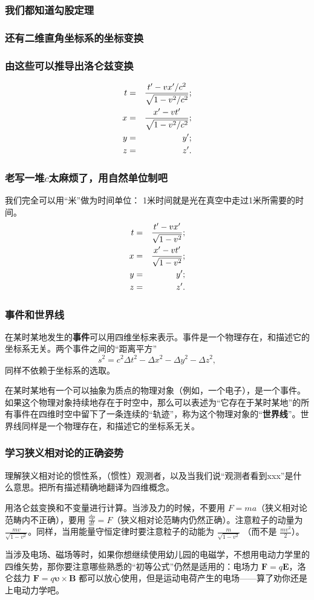 \documentclass[CJK,13pt]{beamer}
\date{}
\begin{document}
  \bch
{}


\begin{frame}
  \frametitle{我们都知道勾股定理}
\end{frame}


\begin{frame}
  \frametitle{还有二维直角坐标系的坐标变换}
\end{frame}


\begin{frame}
  \frametitle{由这些可以推导出洛仑兹变换}
  \begin{eqnarray}
  t&=&\frac{t'-vx'/c^2}{\sqrt{1-v^2/c^2}}; \nonumber \\
  x&=&\frac{x'-vt'}{\sqrt{1-v^2/c^2}}; \nonumber \\
  y&=&y'; \nonumber \\
  z&=&z'. \nonumber
  \end{eqnarray}
\end{frame}


\begin{frame}
  \frametitle{老写一堆$c$太麻烦了，用自然单位制吧}
  我们完全可以用``米''做为时间单位： 1米时间就是光在真空中走过1米所需要的时间。
  \begin{eqnarray}
  t&=&\frac{t'-vx'}{\sqrt{1-v^2}}; \nonumber \\
  x&=&\frac{x'-vt'}{\sqrt{1-v^2}}; \nonumber \\
  y&=&y'; \nonumber \\
  z&=&z'. \nonumber
  \end{eqnarray}
\end{frame}

\begin{frame}
  \frametitle{事件和世界线}
  \bitem
  \item{在某时某地发生的{\bf 事件}可以用四维坐标来表示。事件是一个物理存在，和描述它的坐标系无关。两个事件之间的``距离平方'' $$s^2= c^2\Delta t^2 - \Delta x^2 -\Delta y^2-\Delta z^2,$$同样不依赖于坐标系的选取。}
  \item{在某时某地有一个可以抽象为质点的物理对象（例如，一个电子），是一个事件。如果这个物理对象持续地存在于时空中，那么可以表述为``它存在于某时某地''的所有事件在四维时空中留下了一条连续的“轨迹”，称为这个物理对象的“{\bf 世界线}”。世界线同样是一个物理存在，和描述它的坐标系无关。}
    \eitem
\end{frame}




\begin{frame}
  \frametitle{学习狭义相对论的正确姿势}
  \bitem
\item{理解狭义相对论的惯性系，（惯性）观测者，以及当我们说“观测者看到xxx”是什么意思。把所有描述精确地翻译为四维概念。}
\item{用洛仑兹变换和不变量进行计算。当涉及力的时候，不要用  $F=ma$（狭义相对论范畴内不正确），要用 $\frac{dp}{dt} = F$（狭义相对论范畴内仍然正确）。注意粒子的动量为
  $\frac{mv}{\sqrt{1-v^2}}$。同样，当用能量守恒定律时要注意粒子的动能为 $\frac{m}{\sqrt{1-v^2}}$ （而不是 $\frac{mv^2}{2}$）。}
\item{当涉及电场、磁场等时，如果你想继续使用幼儿园的电磁学，不想用电动力学里的四维矢势，那你要注意哪些熟悉的“初等公式”仍然是适用的：电场力 $\mathbf{F}=q\mathbf{E}$，洛仑兹力
$\mathbf{F} = q\mathbf{\upsilon}\times \mathbf{B}$ 都可以放心使用，但是运动电荷产生的电场——算了劝你还是上电动力学吧。}
  \eitem

\end{frame}
\end{document}

